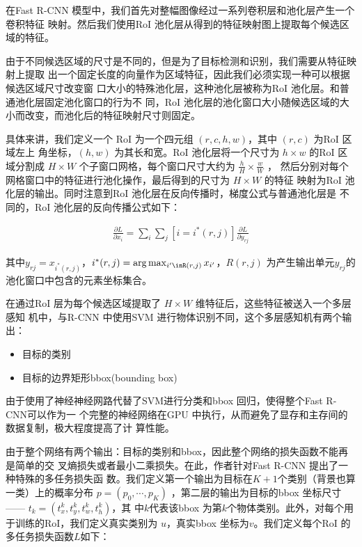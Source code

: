 在Fast R-CNN 模型中，我们首先对整幅图像经过一系列卷积层和池化层产生一个卷积特征
映射。然后我们使用RoI 池化层从得到的特征映射图上提取每个候选区域的特征。

由于不同候选区域的尺寸是不同的，但是为了目标检测和识别，我们需要从特征映射上提取
出一个固定长度的向量作为区域特征，因此我们必须实现一种可以根据候选区域尺寸改变窗
口大小的特殊池化层，这种池化层被称为RoI 池化层。和普通池化层固定池化窗口的行为不
同，RoI 池化层的池化窗口大小随候选区域的大小而改变，而池化后的特征映射尺寸则固定。


具体来讲，我们定义一个 RoI 为一个四元组 $(r,c,h,w)$，其中 $(r,c)$ 为RoI 区域左上
角坐标，$(h, w)$ 为其长和宽。RoI 池化层将一个尺寸为 $h \times w$ 的RoI 区域分割成
$H \times W$ 个子窗口网格，每个窗口尺寸大约为 $\frac{h}{H} \times \frac{w}{W}$ ，
然后分别对每个网格窗口中的特征进行池化操作，最后得到的尺寸为 $H \times W$ 的特征
映射为RoI 池化层的输出。同时注意到RoI 池化层在反向传播时，梯度公式与普通池化层是
不同的，RoI 池化层的反向传播公式如下：

\begin{align}
\frac{\partial L}{\partial x_i} = \sum_{i}\sum_{j}[i = i^*(r,j)]\frac{\partial
  L}{\partial y_{rj}}
\end{align}

其中$y_{rj} = x_{i^*(r,j)}$，$i^*(r,j) = \arg\max_{i'\inR(r,j)}x_{i'}$，$R(r,j)$
为产生输出单元$y_{rj}$的池化窗口中包含的元素坐标集合。

在通过RoI 层为每个候选区域提取了 $H \times W$ 维特征后，这些特征被送入一个多层感知
机中，与R-CNN 中使用SVM 进行物体识别不同，这个多层感知机有两个输出：

\begin{itemize}
  \item 目标的类别
  \item 目标的边界矩形bbox(bounding box)
\end{itemize}

由于使用了神经神经网路代替了SVM进行分类和bbox 回归，使得整个Fast R-CNN可以作为一
个完整的神经网络在GPU 中执行，从而避免了显存和主存间的数据复制，极大程度提高了计
算性能。

由于整个网络有两个输出：目标的类别和bbox，因此整个网络的损失函数不能再是简单的交
叉熵损失或者最小二乘损失。在此，作者针对Fast R-CNN 提出了一种特殊的多任务损失函
数。我们定义第一个输出为目标在$K+1$个类别（背景也算一类）上的概率分布 $p = (p_0,
\cdots, p_K)$ ，第二层的输出为目标的bbox 坐标尺寸 —— $t_k = (t_x^k, t_y^k, t_w^k, t_h^k)$，其
中$k$代表该bbox 为第$k$个物体类别。此外，对每个用于训练的RoI，我们定义真实类别为
$u$，真实bbox 坐标为$v$。我们定义每个RoI 的多任务损失函数$L$如下：

